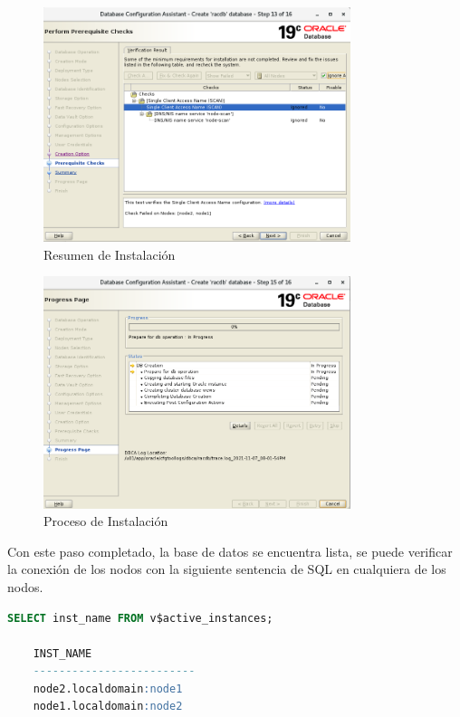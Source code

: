 \documentclass{article}
\begin{document}
\begin{figure}[H]
		\begin{center}
			\includegraphics[width=0.80\textwidth]{db_creation_14_pre_requisite_check_done.png}
		\end{center}
		\caption{Resumen de Instalación}
\end{figure}


\begin{figure}[H]
		\begin{center}
			\includegraphics[width=0.80\textwidth]{db_creation_15_progress.png}
		\end{center}
		\caption{Proceso de Instalación}
\end{figure}

Con este paso completado, la base de datos se encuentra lista, se puede verificar la conexión de los nodos con la siguiente sentencia de SQL en cualquiera de los nodos.


\begin{lstlisting}[style=mystyle,language=sql]
	SELECT inst_name FROM v$active_instances;

	INST_NAME
	-------------------------
	node2.localdomain:node1
	node1.localdomain:node2
\end{lstlisting}
\end{document}

